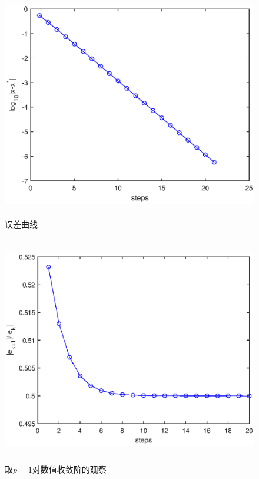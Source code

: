 \documentclass[UTF8,a4paper,10pt]{ctexart}
\begin{document}
        \begin{figure}[htbp]
            \centering
            \includegraphics[width=14cm,height=10cm]{1_error.eps}
            \caption{误差曲线}
        \end{figure}
        \begin{figure}[htbp]
            \centering
            \includegraphics[width=14cm,height=10cm]{1_order.eps}
            \caption{取$p=1$对数值收敛阶的观察} 
        \end{figure}

        \par
        \ 
        \par
        \ 
        \par
        \ 
        \par
        \ 
        \par
        \ 
        \par
\end{document}
